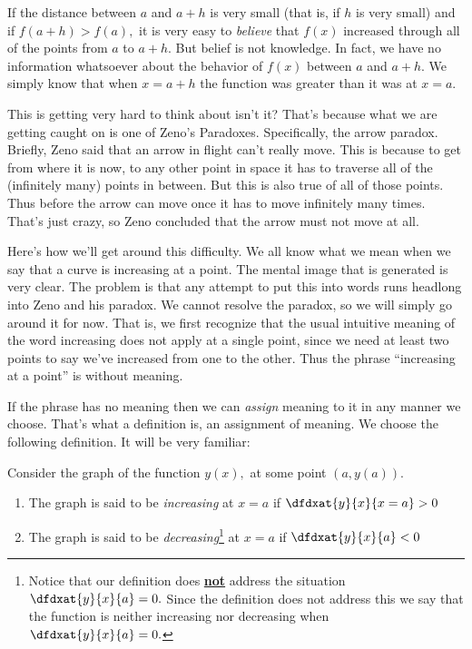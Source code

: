 \begin{Digression}
If the distance between $a$ and $a+h$ is very small (that is, if $h$
is very small) and if $f(a+h)>f(a),$ it is very easy to \emph{believe}
that $f(x)$ increased through all of the points from $a$ to $a+h.$ But
belief is not knowledge. In fact, we have no information whatsoever
about the behavior of $f(x)$ between $a$ and $a+h.$ We simply know
that when $x=a+h$ the function was greater than it was at $x=a.$

This is getting very hard to think about isn't it? That's because what
we are getting caught on is one of Zeno's Paradoxes. Specifically, the
arrow paradox. Briefly, Zeno said that an arrow in flight can't really move. This is
because to get from where it is now, to any other point in space it
has to traverse all of the (infinitely many) points in between. But
this is also true of all of those points. Thus before the arrow can
move once it has to move infinitely many times. That's just crazy, so
Zeno concluded that the arrow must not move at all.

Here's how we'll get around this difficulty. We all know what we mean
when we say that a curve is increasing at a point. The mental image
that is generated is very clear. The problem is that any attempt to
put this into words runs headlong into Zeno and his paradox. We cannot
resolve the paradox, so we will simply go around it for now. That is,
we first recognize that the usual intuitive meaning of the word
increasing does not apply at a single point, since we need at least
two points to say we've increased from one to the other. Thus the
phrase ``increasing at a point'' is without meaning.



If the phrase has no meaning then we can \emph{assign} meaning to it
in any manner we choose. That's what a definition is, an assignment of
meaning. We choose
the following definition. It will be very familiar:\\
\begin{mydefinition}
  \label{def:first-deriv-test}
  Consider the graph of the function $y(x),$ at some point
  $(a, y(a)).$
  \begin{enumerate}
  \item The graph is said to be \emph{increasing} at $x=a$ if
    $\dfdxat{y}{x}{x=a} > 0$
  \item The graph is said to be \emph{decreasing}\footnote{Notice that
      our definition does \underline{\bf{}not} address the situation
      $\dfdxat{y}{x}{a}=0.$ Since the definition does not address
      this we say that the function is neither increasing nor
      decreasing when $\dfdxat{y}{x}{a}=0.$ } at $x=a$ if
    $\dfdxat{y}{x}{a} < 0$
  \end{enumerate}
\end{mydefinition}


\end{Digression}
